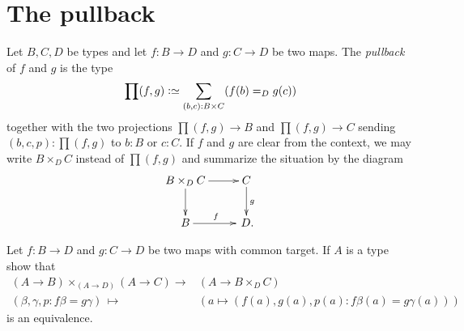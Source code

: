 





\section{The pullback}
\label{sec:pullback}

\begin{definition}
  \label{def:pullback}
  Let $B, C, D$ be types and let $f:B\to D$ and $g:C\to D$ be two maps.
The \emph{pullback} of $f$ and $g$ is the type
$$\prod(f,g)\defequi\sum_{(b,c):B\times C}(f(b)=_Dg(c))$$
together with the two projections $\prod(f,g)\to B$ and $\prod(f,g)\to C$ sending $(b,c,p):\prod(f,g)$ to $b:B$ or $c:C$.  If $f$ and $g$ are clear from the context, we may write $B\times_DC$ instead of $\prod(f,g)$ and summarize the situation by the diagram
$$\xymatrix{B\times_DC\ar[r]\ar[d]&C\ar[d]^g\\B\ar[r]^f&\,D.}$$
\end{definition}
\begin{xca}
  \label{xca:univpropofpullback}
  Let $f:B\to D$ and $g:C\to D$ be two maps with common target.  If $A$ is a type show that
  \begin{align*}
    (A\to B)\times_{(A\to D)}(A\to C)\to &(A\to B\times_DC)\\
(\beta,\gamma,p:f\beta=g\gamma)\,\mapsto\,&(a\mapsto (f(a),g(a),p(a):f\beta(a)=g\gamma(a)))
  \end{align*}
 is an equivalence.
\end{xca}

